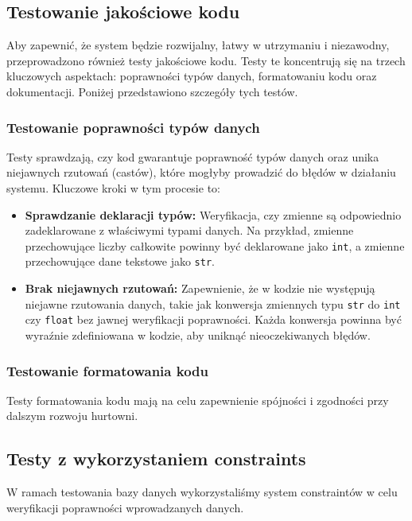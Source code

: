 \documentclass[12pt]{article}
\begin{document}
\subsection{Testowanie jakościowe kodu}

Aby zapewnić, że system będzie rozwijalny, łatwy w utrzymaniu i niezawodny, przeprowadzono również testy jakościowe kodu. Testy te koncentrują się na trzech kluczowych aspektach: poprawności typów danych, formatowaniu kodu oraz dokumentacji. Poniżej przedstawiono szczegóły tych testów.

\subsubsection{Testowanie poprawności typów danych}

Testy sprawdzają, czy kod gwarantuje poprawność typów danych oraz unika niejawnych rzutowań (castów), które mogłyby prowadzić do błędów w działaniu systemu. Kluczowe kroki w tym procesie to:
\begin{itemize}
    \item \textbf{Sprawdzanie deklaracji typów:} Weryfikacja, czy zmienne są odpowiednio zadeklarowane z właściwymi typami danych. Na przykład, zmienne przechowujące liczby całkowite powinny być deklarowane jako \texttt{int}, a zmienne przechowujące dane tekstowe jako \texttt{str}.
    \item \textbf{Brak niejawnych rzutowań:} Zapewnienie, że w kodzie nie występują niejawne rzutowania danych, takie jak konwersja zmiennych typu \texttt{str} do \texttt{int} czy \texttt{float} bez jawnej weryfikacji poprawności. Każda konwersja powinna być wyraźnie zdefiniowana w kodzie, aby uniknąć nieoczekiwanych błędów.
\end{itemize}

\subsubsection{Testowanie formatowania kodu}

Testy formatowania kodu mają na celu zapewnienie spójności i zgodności przy dalszym rozwoju hurtowni.

\subsection{Testy z wykorzystaniem constraints}

W ramach testowania bazy danych wykorzystaliśmy system constraintów w celu weryfikacji poprawności wprowadzanych danych.
\end{document}
